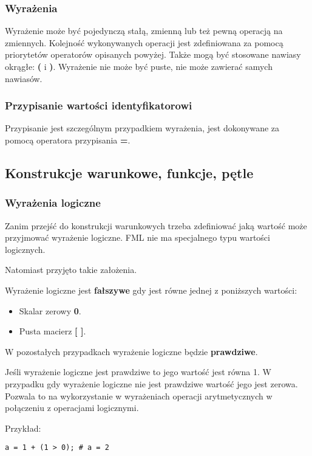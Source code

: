 \documentclass[12pt,a4paper]{article}
\begin{document}
\subsubsection{Wyrażenia}

Wyrażenie może być pojedynczą stałą, zmienną lub też pewną operacją na zmiennych. Kolejność wykonywanych operacji jest zdefiniowana za pomocą priorytetów operatorów opisanych powyżej. Także mogą być stosowane nawiasy okrągłe: \textbf{(} i \textbf{)}. Wyrażenie nie może być puste, nie może zawierać samych nawiasów.

\subsubsection{Przypisanie wartości identyfikatorowi}

Przypisanie jest szczególnym przypadkiem wyrażenia, jest dokonywane za pomocą operatora przypisania \textbf{=}. 

\subsection{Konstrukcje warunkowe, funkcje, pętle}

\subsubsection{Wyrażenia logiczne}

Zanim przejść do konstrukcji warunkowych trzeba zdefiniować jaką wartość może przyjmować wyrażenie logiczne. FML nie ma specjalnego typu wartości logicznych. 

Natomiast przyjęto takie założenia.

Wyrażenie logiczne jest \textbf{fałszywe} gdy jest równe jednej z poniższych wartości:

\begin{itemize}
  \item Skalar zerowy \textbf{0}.
  \item Pusta macierz \textbf{[ ]}.
\end{itemize}

W pozostałych przypadkach wyrażenie logiczne będzie \textbf{prawdziwe}.

Jeśli wyrażenie logiczne jest prawdziwe to jego wartość jest równa 1. W przypadku gdy wyrażenie logiczne nie jest prawdziwe wartość jego jest zerowa.
Pozwala to na wykorzystanie w wyrażeniach operacji arytmetycznych w połączeniu z operacjami logicznymi.

\smallbreak
Przykład:
\begin{lstlisting}
a = 1 + (1 > 0); # a = 2 
\end{lstlisting}
\end{document}
